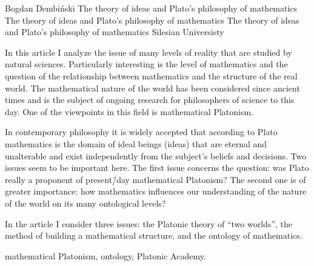 \begin{artengenv}{Bogdan Dembiński}
	{The theory of ideas and Plato’s philosophy of mathematics}
	{The theory of ideas and Plato’s philosophy of mathematics}
	{The theory of ideas and Plato’s philosophy of mathematics}
	{Silesian Universisty}
	{In this article I analyze the issue of many levels of reality that are studied by natural sciences. Particularly
		interesting is the level of mathematics and the question of the relationship between mathematics and the
		structure of the real world. The mathematical nature of the world has been considered since ancient times and is
		the subject of ongoing research for philosophers of science to this day. One of the viewpoints in this field is
		mathematical Platonism.
		
		In contemporary philosophy it is widely accepted that according to Plato mathematics is the domain of ideal beings
		(ideas) that are eternal and unalterable and exist independently from the subject's beliefs and decisions. Two issues
		seem to be important here. The first issue concerns the question: was Plato really a proponent of present\=/day
		mathematical Platonism? The second one is of greater importance: how mathematics influences our understanding of the
		nature of the world on its many ontological levels?
		
		In the article I consider three issues: the Platonic theory of ``two worlds'', the method of
		building a mathematical structure, and the ontology of mathematics.}
	{mathematical Platonism, ontology, Platonic Academy.}








\end{artengenv}
